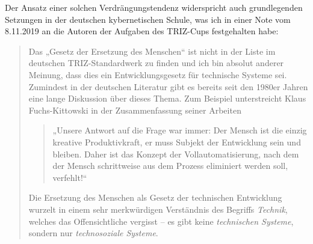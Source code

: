 \documentclass[11pt,a4paper]{article}
\begin{document}
Der Ansatz einer solchen Verdrängungstendenz widerspricht auch grundlegenden
Setzungen in der deutschen kybernetischen Schule, was ich in einer Note vom
8.11.2019 an die Autoren der Aufgaben des TRIZ-Cups festgehalten habe:
\begin{quote}
  Das „Gesetz der Ersetzung des Menschen“ ist nicht in der Liste im deutschen
  TRIZ-Standardwerk \cite{KoltzeSouchkov2017} zu finden und ich bin absolut
  anderer Meinung, dass dies ein Entwicklungsgesetz für technische Systeme
  sei.  Zumindest in der deutschen Literatur gibt es bereits seit den 1980er
  Jahren eine lange Diskussion über dieses Thema. Zum Beispiel unterstreicht
  Klaus Fuchs-Kittowski in der Zusammenfassung \cite{KFK2000} seiner Arbeiten
  \begin{quote}
    „Unsere Antwort auf die Frage war immer: Der Mensch ist die einzig kreative
    Produktivkraft, er muss Subjekt der Entwicklung sein und bleiben.  Daher
    ist das Konzept der Vollautomatisierung, nach dem der Mensch schrittweise
    aus dem Prozess eliminiert werden soll, verfehlt!“ \cite[S. 10]{KFK2000}
  \end{quote}
  Die Ersetzung des Menschen als Gesetz der technischen Entwicklung wurzelt in
  einem sehr merkwürdigen Verständnis des Begriffs \emph{Technik}, welches das
  Offensichtliche vergisst -- es gibt keine \emph{technischen Systeme},
  sondern nur \emph{technosoziale Systeme}.
\end{quote}
\end{document}
